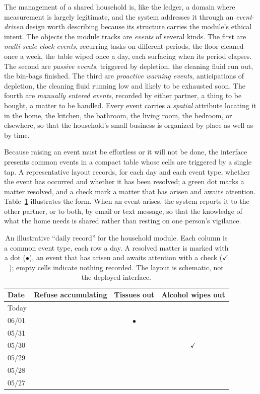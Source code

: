 The management of a shared household is, like the ledger, a domain where measurement is largely legitimate, and the system addresses it through an \emph{event-driven} design worth describing because its structure carries the module's ethical intent. The objects the module tracks are \emph{events} of several kinds. The first are \emph{multi-scale clock events}, recurring tasks on different periods, the floor cleaned once a week, the table wiped once a day, each surfacing when its period elapses. The second are \emph{passive events}, triggered by depletion, the cleaning fluid run out, the bin-bags finished. The third are \emph{proactive warning events}, anticipations of depletion, the cleaning fluid running low and likely to be exhausted soon. The fourth are \emph{manually entered events}, recorded by either partner, a thing to be bought, a matter to be handled. Every event carries a \emph{spatial} attribute locating it in the home, the kitchen, the bathroom, the living room, the bedroom, or elsewhere, so that the household's small business is organized by place as well as by time.

Because raising an event must be effortless or it will not be done, the interface presents common events in a compact table whose cells are triggered by a single tap. A representative layout records, for each day and each event type, whether the event has occurred and whether it has been resolved; a green dot marks a matter resolved, and a check mark a matter that has arisen and awaits attention. Table~\ref{p01:tab:household} illustrates the form. When an event arises, the system reports it to the other partner, or to both, by email or text message, so that the knowledge of what the home needs is shared rather than resting on one person's vigilance.

\begin{small}
\renewcommand{\arraystretch}{1.25}
\begin{table}[h]
\centering
\caption{An illustrative ``daily record'' for the household module. Each column is a common event type, each row a day. A resolved matter is marked with a dot ($\bullet$), an event that has arisen and awaits attention with a check ($\checkmark$); empty cells indicate nothing recorded. The layout is schematic, not the deployed interface.}\label{p01:tab:household}
\begin{tabular}{@{}l c c c@{}}
\toprule
\textbf{Date} & \textbf{Refuse accumulating} & \textbf{Tissues out} & \textbf{Alcohol wipes out}\\
\midrule
Today  &  &  & \\
06/01  &  & $\bullet$ & \\
05/31  &  &  & \\
05/30  &  &  & $\checkmark$\\
05/29  &  &  & \\
05/28  &  &  & \\
05/27  &  &  & \\
\bottomrule
\end{tabular}
\end{table}
\end{small}

